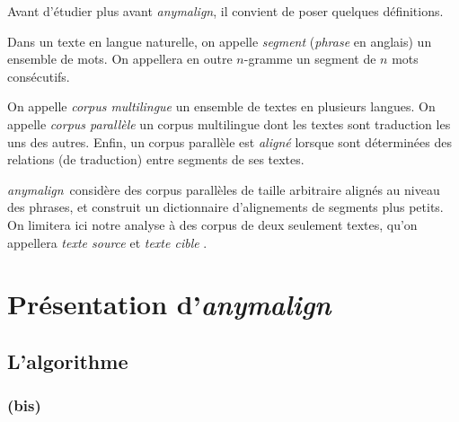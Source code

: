\documentclass[a4paper,10pt]{article}
\newcommand{\anym}{\emph{anymalign}}
\begin{document}
Avant d'étudier plus avant \anym, il convient de poser quelques définitions.

Dans un texte en langue naturelle, on appelle \emph{segment} (\emph{phrase} en anglais) un ensemble de mots. On appellera en outre $n$-gramme un segment de $n$ mots consécutifs.

On appelle \emph{corpus multilingue} un ensemble de textes en plusieurs langues. On appelle \emph{corpus parallèle} un corpus multilingue dont les textes sont traduction les uns des autres. Enfin, un corpus parallèle est \emph{aligné} lorsque sont déterminées des relations (de traduction) entre segments de ses textes.

\anym~considère des corpus parallèles de taille arbitraire alignés au niveau des phrases, et construit un dictionnaire d'alignements de segments plus petits. On limitera ici notre analyse à des corpus de deux seulement textes, qu'on appellera \emph{texte source} et \emph{texte cible}
.





\section{Présentation d'\emph{anymalign}}

\subsection{L'algorithme}

\subsubsection{(bis)}
\end{document}
